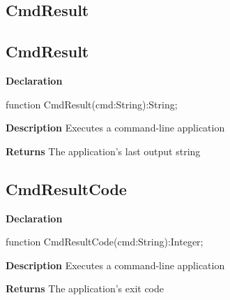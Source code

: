 \documentclass{report}
\newif\ifpdf
\begin{document}
\subsection*{\large{\textbf{CmdResult}}\normalsize\hspace{1ex}\hrulefill}
\else
\subsection*{CmdResult}
\fi
\label{licommon-CmdResult}
\begin{list}{}{
\setlength{\itemindent}{0cm}
\setlength{\listparindent}{0cm}
\setlength{\leftmargin}{\evensidemargin}
\addtolength{\leftmargin}{\tmplength}
\settowidth{\labelsep}{X}
\addtolength{\leftmargin}{\labelsep}
\setlength{\labelwidth}{\tmplength}
}
\item[\textbf{Declaration}\hfill]
\ifpdf
\begin{flushleft}
\fi
\begin{ttfamily}
function CmdResult(cmd:String):String;\end{ttfamily}

\ifpdf
\end{flushleft}
\fi

\par
\item[\textbf{Description}]
Executes a command{-}line application \par
\item[\textbf{Returns}]The application's last output string


\end{list}
\ifpdf
\subsection*{\large{\textbf{CmdResultCode}}\normalsize\hspace{1ex}\hrulefill}
\else
\subsection*{CmdResultCode}
\fi
\label{licommon-CmdResultCode}
\begin{list}{}{
\setlength{\itemindent}{0cm}
\setlength{\listparindent}{0cm}
\setlength{\leftmargin}{\evensidemargin}
\addtolength{\leftmargin}{\tmplength}
\settowidth{\labelsep}{X}
\addtolength{\leftmargin}{\labelsep}
\setlength{\labelwidth}{\tmplength}
}
\item[\textbf{Declaration}\hfill]
\ifpdf
\begin{flushleft}
\fi
\begin{ttfamily}
function CmdResultCode(cmd:String):Integer;\end{ttfamily}

\ifpdf
\end{flushleft}
\fi

\par
\item[\textbf{Description}]
Executes a command{-}line application \par
\item[\textbf{Returns}]The application's exit code


\end{list}
\ifpdf
\end{document}
